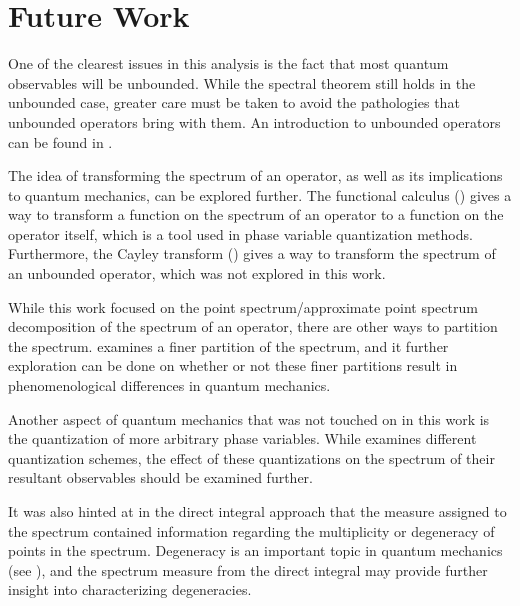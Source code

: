 \section{Future Work}
One of the clearest issues in this analysis is the fact that most quantum
observables will be unbounded. While the spectral theorem still holds in the
unbounded case, greater care must be taken to avoid the pathologies that
unbounded operators bring with them. An introduction to unbounded operators can
be found in \cite[Ch. 9]{Hall2013}.

The idea of transforming the spectrum of an operator, as well as its
implications to quantum mechanics, can be explored further. The functional
calculus (\cite[Ch. 5]{MacCluer2009}) gives a way to transform a function on the
spectrum of an operator to a function on the operator itself, which is a tool
used in phase variable quantization methods. Furthermore, the Cayley transform
(\cite[Th. 10.28]{Hall2013}) gives a way to transform the spectrum of an
unbounded operator, which was not explored in this work.

While this work focused on the point spectrum/approximate point spectrum
decomposition of the spectrum of an operator, there are other ways to partition
the spectrum. \cite{Kubrusly2008} examines a finer partition of the spectrum,
and it further exploration can be done on whether or not these finer partitions
result in phenomenological differences in quantum mechanics.

Another aspect of quantum mechanics that was not touched on in this work is the
quantization of more arbitrary phase variables. While \cite[Ch. 13]{Hall2013}
examines different quantization schemes, the effect of these quantizations on
the spectrum of their resultant observables should be examined further.

It was also hinted at in the direct integral approach that the measure assigned
to the spectrum contained information regarding the multiplicity or degeneracy
of points in the spectrum. Degeneracy is an important topic in quantum
mechanics (see \cite[Ch. 6.2]{griffiths2005}), and the spectrum measure from the
direct integral may provide further insight into characterizing degeneracies.

